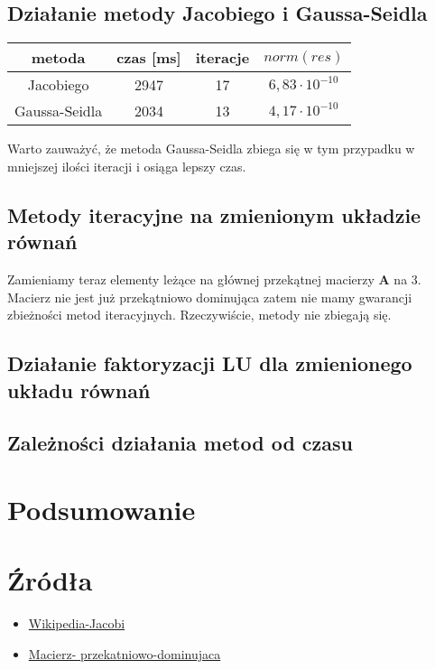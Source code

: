 \documentclass{article}
\begin{document}
\subsection{Działanie metody Jacobiego i Gaussa-Seidla}
\begin{center}
\begin{tabular}{ c | c c c}
 metoda & czas [ms] & iteracje & $norm(res)$ \\ 
\hline
 Jacobiego & 2947 & 17 & $6,83 \cdot 10^{-10}$\\  
 Gaussa-Seidla & 2034 & 13 & $4,17 \cdot 10^{-10} $  
\end{tabular}
\end{center}
Warto zauważyć, że metoda Gaussa-Seidla zbiega się w tym przypadku w mniejszej ilości iteracji
i osiąga lepszy czas.
\subsection{Metody iteracyjne na zmienionym układzie równań}
Zamieniamy teraz elementy leżące na głównej przekątnej macierzy $\boldsymbol{A}$ na 3.
Macierz nie jest już przekątniowo dominująca zatem nie mamy gwarancji zbieżności metod iteracyjnych.
Rzeczywiście, metody nie zbiegają się. 

\subsection{Działanie faktoryzacji LU dla zmienionego układu równań}
\subsection{Zależności działania metod od czasu}
\section{Podsumowanie}
\section{Źródła}
\begin{itemize}
	\item \href{https://en.wikipedia.org/wiki/Jacobi_method}{Wikipedia-Jacobi}
	\item \href{https://pl.wikipedia.org/wiki/Macierz_przek%C4%85tniowo_dominuj%C4%85ca}{Macierz-
przekatniowo-dominujaca}
\end{itemize}
\end{document}
